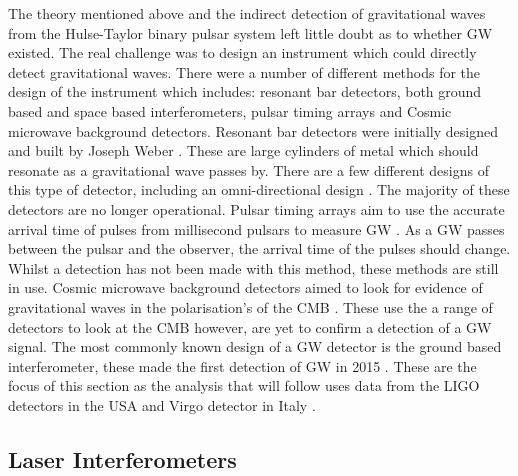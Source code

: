 The theory mentioned above and the indirect detection of gravitational waves from the Hulse-Taylor binary pulsar system left little doubt as to whether \ac{GW} existed. 
The real challenge was to design an instrument which could directly detect gravitational waves.
There were a number of different methods for the design of the instrument which includes: resonant bar detectors, both ground based and space based interferometers, pulsar timing arrays and Cosmic microwave background detectors. 
Resonant bar detectors were initially designed and built by Joseph Weber \citep{Weber1966ObservationDetector}.
These are large cylinders of metal which should resonate as a gravitational wave passes by. 
There are a few different designs of this type of detector, including an omni-directional design \citep{DeWaard2003MiniGRAILDetector}.
The majority of these detectors are no longer operational.
Pulsar timing arrays aim to use the accurate arrival time of pulses from millisecond pulsars to measure \ac{GW} \citep{Hobbs2017GravitationalArrays}. As a \ac{GW} passes between the pulsar and the observer, the arrival time of the pulses should change. 
Whilst a detection has not been made with this method, these methods are still in use.
Cosmic microwave background detectors aimed to look for evidence of gravitational waves in the polarisation's of the CMB \citep{Ade2018ConstraintsSeason}. 
These use the a range of detectors to look at the CMB however, are yet to confirm a detection of a \ac{GW} signal.
The most commonly known design of a \ac{GW} detector is the ground based interferometer, these made the first detection of \ac{GW} in 2015 \citep{Abbott2016}.
These are the focus of this section as the analysis that will follow uses data from the \ac{LIGO} detectors in the USA \citep{Abbott2009,Aasi2015} and Virgo detector in Italy \citep{Acernese2015,Acernese2008}.

\subsection{Laser Interferometers}

